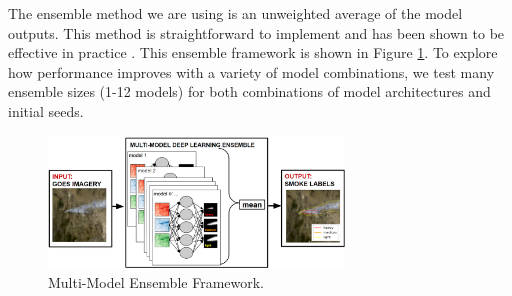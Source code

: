 \documentclass{article}
\begin{document}
The ensemble method we are using is an unweighted average of the model outputs. This method is straightforward to implement and has been shown to be effective in practice \citep{nn-ensemble2}. This ensemble framework is shown in Figure \ref{fig:ensemble_framework}. To explore how performance improves with a variety of model combinations, we test many ensemble sizes (1-12 models) for both combinations of model architectures and initial seeds.
\begin{figure}[h]
    \centering
    \includegraphics[width=0.7\textwidth]{ensemble_framework.png}
    \caption{Multi-Model Ensemble Framework.}
    \label{fig:ensemble_framework}
\end{figure}
\end{document}
